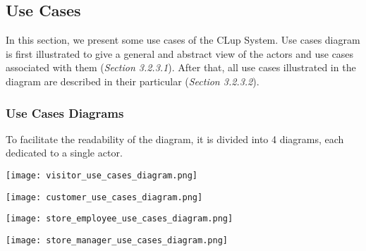 \subsection{Use Cases}

    In this section, we present some use cases of the CLup System. Use cases diagram is first illustrated to give a general and abstract view of the actors and use cases associated with them (\textit{Section 3.2.3.1}). After that, all use cases illustrated in the diagram are described in their particular (\textit{Section 3.2.3.2}).
    \subsubsection{Use Cases Diagrams}
    To facilitate the readability of the diagram, it is divided into 4 diagrams, each dedicated to a single actor.
        \begin{center}

            \texttt{[image: visitor\_use\_cases\_diagram.png]}

            \texttt{[image: customer\_use\_cases\_diagram.png]}

            \texttt{[image: store\_employee\_use\_cases\_diagram.png]}

            \texttt{[image: store\_manager\_use\_cases\_diagram.png]}
            
        \end{center}

